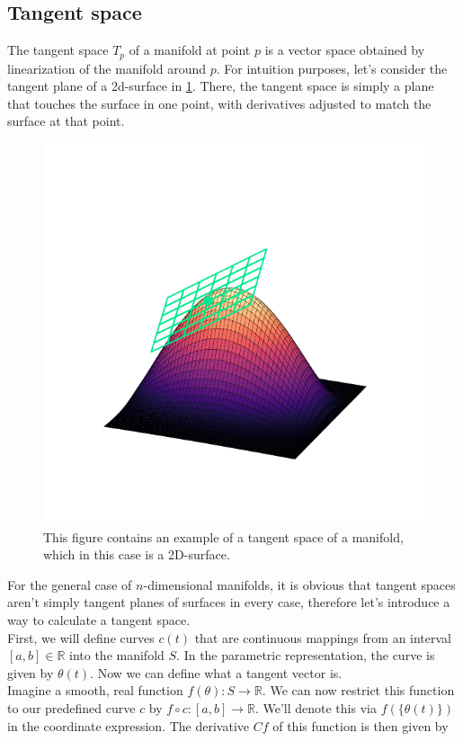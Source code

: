 \subsection{Tangent space}
The tangent space $T_p$ of a manifold at point $p$ is a vector space obtained by linearization of the manifold around $p$. For intuition purposes, let's consider the tangent plane of a 2d-surface in \cref{fig:TangentSpacePlot}. There, the tangent space is simply a plane that touches the surface in one point, with derivatives adjusted to match the surface at that point.
\begin{figure}\label{fig:TangentSpacePlot}
	\centering
	\includegraphics[width = 12cm, clip, trim= 0cm 1.5cm 0cm 2cm]{text/FisherInformation/plots/TangentSpacePlot.pdf}
	\caption{This figure contains an example of a tangent space of a manifold, which in this case is a 2D-surface.}
\end{figure}
For the general case of $n$-dimensional manifolds, it is obvious that tangent spaces aren't simply tangent planes of surfaces in every case, therefore let's introduce a way to calculate a tangent space.\\
First, we will define curves $c(t)$ that are continuous mappings from an interval $[a,b] \in \mathbb{R}$ into the manifold $S$. In the parametric representation, the curve is given by $\theta(t)$. Now we can define what a tangent vector is.\\
Imagine a smooth, real function $f(\theta): S \rightarrow \mathbb{R}$. We can now restrict this function to our predefined curve $c$ by $f \circ c : [a,b] \rightarrow \mathbb{R}$. We'll denote this via $f\left(\{\theta(t)\}\right)$ in the coordinate expression. The derivative $Cf$ of this function is then given by \cite{AmarisLectureNotes}
